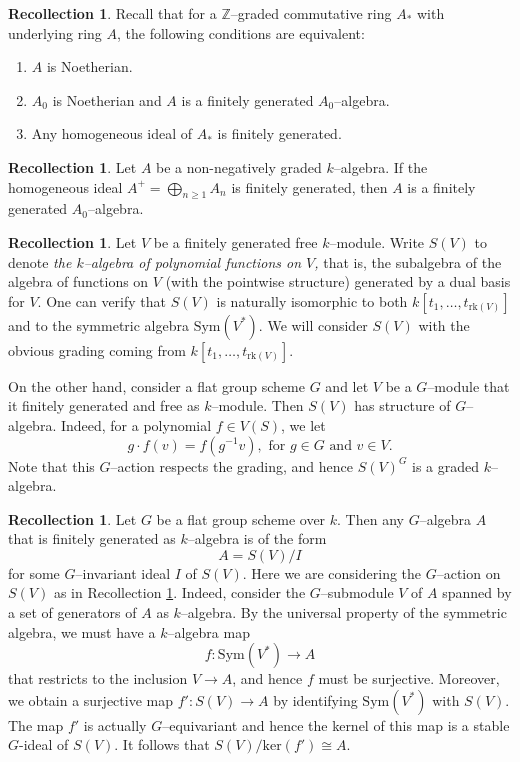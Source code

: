\documentclass{article}
\theoremstyle{plain}
\theoremstyle{definition}
\newtheorem{Rec}[Th]{Recollection}
\begin{document}
\begin{Rec}\label{Noetherianity for graded ring}
    Recall that for a $\mathbb Z$--graded commutative ring $A_\ast$ with underlying ring $A$, the following conditions are equivalent:
    \begin{enumerate}
        \item  $A$ is Noetherian.
        \item $A_0$ is Noetherian and  $A$ is a finitely generated  $A_0$--algebra.
        \item Any homogeneous ideal of $A_\ast$ is finitely generated. 
    \end{enumerate}
\end{Rec}

\begin{Rec}\label{Rec: A+ is finitely generated}
   Let $A$ be a non-negatively graded $k$--algebra. If the homogeneous ideal $A^+=\bigoplus_{n\geq 1}A_{n}$ is finitely generated, then $A$ is a finitely generated $A_0$--algebra. 
   \end{Rec}


\begin{Rec}\label{Rec: SV}
    Let $V$ be a finitely generated free $k$--module. Write $S(V)$ to denote \textit{the $k$--algebra of polynomial functions on $V$,} that is, the subalgebra of the algebra of functions on $V$ (with the pointwise structure) generated by a dual basis for $V$.  One can verify that $S(V)$ is naturally isomorphic to both $ k[t_1,\ldots, t_{\mathrm{rk}(V)}]$ and to the symmetric algebra $\mathrm{Sym}(V^\ast)$. We will consider $S(V)$ with the obvious grading coming from $k[t_1,\ldots, t_{\mathrm{rk}(V)}]$. 

  On the other hand, consider a flat group scheme $G$ and let  $V$ be a $G$--module that it finitely generated and free as $k$--module. Then  $S(V)$ has structure of $G$--algebra. Indeed, for a polynomial $f\in V(S)$, we let
  \[
  g\cdot f(v)=f(g^{-1}v), \textrm{ for } g\in G \textrm{ and } v\in V. 
  \]
   Note that this $G$--action respects the grading, and hence $S(V)^G$ is a graded $k$--algebra. 
\end{Rec}

\begin{Rec}\label{structure of G-algebras}
    Let $G$ be a flat group scheme over $k$. Then any $G$--algebra $A$ that is finitely generated as $k$--algebra is of the form 
    \[A= S(V)/ I\]
    for some $G$--invariant ideal $I$ of $S(V)$. Here we are considering the $G$--action on $S(V)$ as in Recollection \ref{Rec: SV}. Indeed, consider the $G$--submodule $V$ of $A$ spanned by a set of generators of $A$ as $k$--algebra. By the universal property of the symmetric algebra, we must have a $k$--algebra map 
    \[f\colon \mathrm{Sym}(V^\ast) \to A\]
    that restricts to the inclusion $V\to A$, and hence $f$ must be surjective.  Moreover, we obtain a surjective map $f'\colon S(V)\to A$ by identifying  $\mathrm{Sym}(V^\ast)$  with $S(V)$. The map $f'$  is actually $G$--equivariant and hence  the kernel of this map is a stable $G$-ideal of $S(V)$. It follows that $S(V)/\mathrm{ker}(f')\cong A$.   
\end{Rec}
\end{document}
